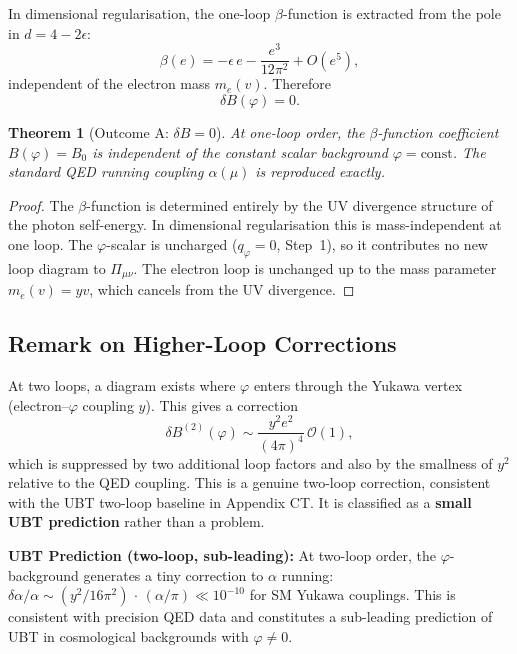 \documentclass[12pt]{article}
\newtheorem{theorem}{Theorem}[section]
\theoremstyle{definition}
\theoremstyle{remark}
\begin{document}
In dimensional regularisation, the one-loop $\beta$-function is extracted from the pole
in $d=4-2\epsilon$:
\begin{equation}
  \beta(e) = -\epsilon\,e - \frac{e^3}{12\pi^2} + O(e^5),
\end{equation}
independent of the electron mass $m_e(v)$.  Therefore
\begin{equation}
  \boxed{\delta B(\varphi) = 0.}
\end{equation}

\begin{theorem}[Outcome A: $\delta B = 0$]
  At one-loop order, the $\beta$-function coefficient $B(\varphi) = B_0$ is independent
  of the constant scalar background $\varphi = \mathrm{const}$.  The standard QED running
  coupling $\alpha(\mu)$ is reproduced exactly.
\end{theorem}

\begin{proof}
  The $\beta$-function is determined entirely by the UV divergence structure of the photon
  self-energy.  In dimensional regularisation this is mass-independent at one loop.
  The $\varphi$-scalar is uncharged ($q_\varphi = 0$, Step~1), so it contributes no new
  loop diagram to $\Pi_{\mu\nu}$.  The electron loop is unchanged up to the mass parameter
  $m_e(v) = yv$, which cancels from the UV divergence.
\end{proof}

\subsection{Remark on Higher-Loop Corrections}

At two loops, a diagram exists where $\varphi$ enters through the Yukawa vertex
(electron--$\varphi$ coupling $y$).  This gives a correction
\begin{equation}
  \delta B^{(2)}(\varphi) \sim \frac{y^2 e^2}{(4\pi)^4}\,\mathcal{O}(1),
\end{equation}
which is suppressed by two additional loop factors and also by the smallness of $y^2$
relative to the QED coupling.  This is a genuine two-loop correction, consistent with
the UBT two-loop baseline in Appendix CT.  It is classified as a \textbf{small UBT
prediction} rather than a problem.

\begin{predbox}
\textbf{UBT Prediction (two-loop, sub-leading):}
At two-loop order, the $\varphi$-background generates a tiny correction to $\alpha$ running:
$\delta\alpha/\alpha \sim (y^2/16\pi^2)\,\cdot\,(\alpha/\pi) \ll 10^{-10}$ for SM Yukawa
couplings.  This is consistent with precision QED data and constitutes a sub-leading
prediction of UBT in cosmological backgrounds with $\varphi \neq 0$.
\end{predbox}
\end{document}
